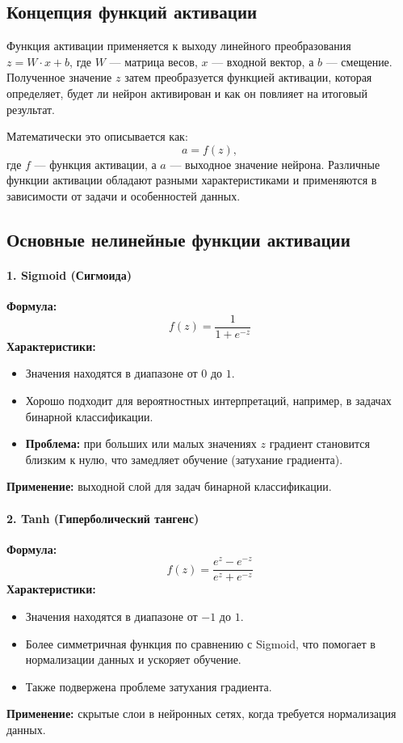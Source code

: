{\subsection*{Концепция функций активации}
Функция активации применяется к выходу линейного преобразования $z = W \cdot x + b$, где $W$ — матрица весов, $x$ — входной вектор, а $b$ — смещение. Полученное значение $z$ затем преобразуется функцией активации, которая определяет, будет ли нейрон активирован и как он повлияет на итоговый результат.

Математически это описывается как:
\[
    a = f(z),
\]
где $f$ — функция активации, а $a$ — выходное значение нейрона. Различные функции активации обладают разными характеристиками и применяются в зависимости от задачи и особенностей данных.

\subsection*{Основные нелинейные функции активации}

\paragraph{1. Sigmoid (Сигмоида)}
\textbf{Формула:}
\[
    f(z) = \frac{1}{1 + e^{-z}}
\]
\textbf{Характеристики:}
\begin{itemize}
    \item Значения находятся в диапазоне от $0$ до $1$.
    \item Хорошо подходит для вероятностных интерпретаций, например, в задачах бинарной классификации.
    \item \textbf{Проблема:} при больших или малых значениях $z$ градиент становится близким к нулю, что замедляет обучение (затухание градиента).
\end{itemize}
\textbf{Применение:} выходной слой для задач бинарной классификации.

\paragraph{2. Tanh (Гиперболический тангенс)}
\textbf{Формула:}
\[
    f(z) = \frac{e^z - e^{-z}}{e^z + e^{-z}}
\]
\textbf{Характеристики:}
\begin{itemize}
    \item Значения находятся в диапазоне от $-1$ до $1$.
    \item Более симметричная функция по сравнению с Sigmoid, что помогает в нормализации данных и ускоряет обучение.
    \item Также подвержена проблеме затухания градиента.
\end{itemize}
\textbf{Применение:} скрытые слои в нейронных сетях, когда требуется нормализация данных.

}
